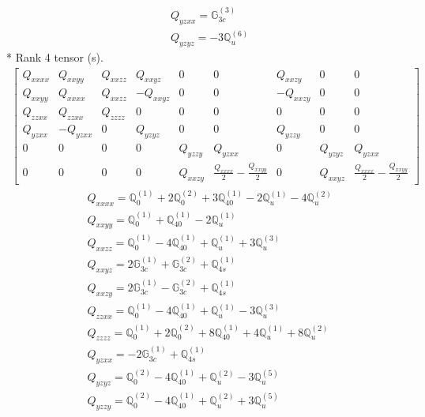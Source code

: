 \documentclass[fleqn,8pt,landscape]{jsarticle}
\begin{document}
\begin{align*}
& Q_{yzxx} = \mathbb{G}_{3c}^{(3)} \\
& Q_{yzyz} = - 3 \mathbb{Q}_{u}^{(6)}
\end{align*}
* Rank 4 tensor (s).
\begin{align*}
\begin{bmatrix} Q_{xxxx} & Q_{xxyy} & Q_{xxzz} & Q_{xxyz} & 0 & 0 & Q_{xxzy} & 0 & 0 \\ Q_{xxyy} & Q_{xxxx} & Q_{xxzz} & - Q_{xxyz} & 0 & 0 & - Q_{xxzy} & 0 & 0 \\ Q_{zzxx} & Q_{zzxx} & Q_{zzzz} & 0 & 0 & 0 & 0 & 0 & 0 \\ Q_{yzxx} & - Q_{yzxx} & 0 & Q_{yzyz} & 0 & 0 & Q_{yzzy} & 0 & 0 \\ 0 & 0 & 0 & 0 & Q_{yzzy} & Q_{yzxx} & 0 & Q_{yzyz} & Q_{yzxx} \\ 0 & 0 & 0 & 0 & Q_{xxzy} & \frac{Q_{xxxx}}{2} - \frac{Q_{xxyy}}{2} & 0 & Q_{xxyz} & \frac{Q_{xxxx}}{2} - \frac{Q_{xxyy}}{2} \end{bmatrix}
\end{align*}
\begin{align*}
& Q_{xxxx} = \mathbb{Q}_{0}^{(1)} + 2 \mathbb{Q}_{0}^{(2)} + 3 \mathbb{Q}_{40}^{(1)} - 2 \mathbb{Q}_{u}^{(1)} - 4 \mathbb{Q}_{u}^{(2)} \\
& Q_{xxyy} = \mathbb{Q}_{0}^{(1)} + \mathbb{Q}_{40}^{(1)} - 2 \mathbb{Q}_{u}^{(1)} \\
& Q_{xxzz} = \mathbb{Q}_{0}^{(1)} - 4 \mathbb{Q}_{40}^{(1)} + \mathbb{Q}_{u}^{(1)} + 3 \mathbb{Q}_{u}^{(3)} \\
& Q_{xxyz} = 2 \mathbb{G}_{3c}^{(1)} + \mathbb{G}_{3c}^{(2)} + \mathbb{Q}_{4s}^{(1)} \\
& Q_{xxzy} = 2 \mathbb{G}_{3c}^{(1)} - \mathbb{G}_{3c}^{(2)} + \mathbb{Q}_{4s}^{(1)} \\
& Q_{zzxx} = \mathbb{Q}_{0}^{(1)} - 4 \mathbb{Q}_{40}^{(1)} + \mathbb{Q}_{u}^{(1)} - 3 \mathbb{Q}_{u}^{(3)} \\
& Q_{zzzz} = \mathbb{Q}_{0}^{(1)} + 2 \mathbb{Q}_{0}^{(2)} + 8 \mathbb{Q}_{40}^{(1)} + 4 \mathbb{Q}_{u}^{(1)} + 8 \mathbb{Q}_{u}^{(2)} \\
& Q_{yzxx} = - 2 \mathbb{G}_{3c}^{(1)} + \mathbb{Q}_{4s}^{(1)} \\
& Q_{yzyz} = \mathbb{Q}_{0}^{(2)} - 4 \mathbb{Q}_{40}^{(1)} + \mathbb{Q}_{u}^{(2)} - 3 \mathbb{Q}_{u}^{(5)} \\
& Q_{yzzy} = \mathbb{Q}_{0}^{(2)} - 4 \mathbb{Q}_{40}^{(1)} + \mathbb{Q}_{u}^{(2)} + 3 \mathbb{Q}_{u}^{(5)}
\end{align*}
\end{document}
